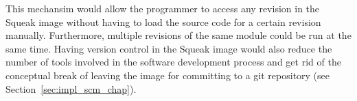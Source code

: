 This mechansim would allow the programmer to access any revision in the Squeak image without having to load the source code for a certain revision manually. Furthermore, multiple revisions of the same module could be run at the same time. Having version control in the Squeak image would also reduce the number of tools involved in the software development process and get rid of the conceptual break of leaving the image for committing to a git repository (see Section~\ref{sec:impl_scm_chap}).
